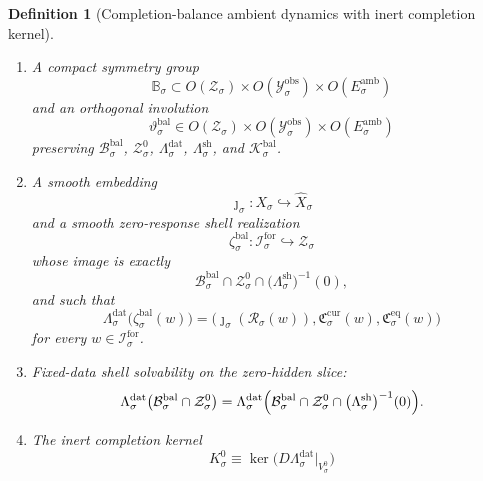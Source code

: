 \documentclass[11pt]{article}
\newcommand{\ForSpace}[1]{\mathcal I_{#1}^{\mathrm{for}}}
\newcommand{\Reduction}[1]{\mathcal R_{#1}}
\newcommand{\CurrentCarrier}[1]{\mathfrak C_{#1}^{\mathrm{cur}}}
\newcommand{\EqCarrier}[1]{\mathfrak C_{#1}^{\mathrm{eq}}}
\newcommand{\VisibleAffine}[1]{\widehat X_{#1}}
\newcommand{\DataSpace}[1]{\mathcal Y_{#1}^{\mathrm{obs}}}
\newcommand{\AmbientTarget}[1]{E_{#1}^{\mathrm{amb}}}
\newcommand{\BalSpace}[1]{\mathcal Z_{#1}}
\newcommand{\BalBody}[1]{\mathcal B_{#1}^{\mathrm{bal}}}
\newcommand{\BalData}[1]{\Lambda_{#1}^{\mathrm{dat}}}
\newcommand{\BalShell}[1]{\Lambda_{#1}^{\mathrm{sh}}}
\newcommand{\ZeroHiddenSlice}[1]{\mathcal Z_{#1}^{0}}
\newcommand{\ZeroHiddenVec}[1]{V_{#1}^{0}}
\newcommand{\Kernel}[1]{K_{#1}^{0}}
\newcommand{\BalOp}[1]{\mathcal K_{#1}^{\mathrm{bal}}}
\newcommand{\BalSym}[1]{\mathbb B_{#1}}
\newcommand{\BalTime}[1]{\vartheta_{#1}^{\mathrm{bal}}}
\newcommand{\BalEmbed}[1]{\zeta_{#1}^{\mathrm{bal}}}
\newcommand{\GapSpace}[1]{H_{#1}}
\newcommand{\GapBody}[1]{D_{#1}}
\newtheorem{definition}{Definition}
\begin{document}
\begin{definition}[Completion-balance ambient dynamics with inert completion kernel]
\begin{enumerate}
    \[
    \GapBody{\sigma}
    \equiv
    \left\{
    \eta\in\GapSpace{\sigma}:
    z+\eta\in\BalBody{\sigma}
    \text{ for some }z\in \BalBody{\sigma}\cap\ZeroHiddenSlice{\sigma}
    \right\}
    \]
    is compact and convex, satisfies
    \[
    0\in\operatorname{int}\GapBody{\sigma},
    \]
    and the ambient admissible body splits exactly as
    \begin{equation}
    \BalBody{\sigma}
    =
    \left\{
    z+\eta:
    z\in\BalBody{\sigma}\cap\ZeroHiddenSlice{\sigma},
    \quad
    \eta\in\GapBody{\sigma}
    \right\}.
    \label{eq:bodysplitting}
    \end{equation}
    \item A compact symmetry group
    \[
    \BalSym{\sigma}\subset
    O(\BalSpace{\sigma})\times
    O(\DataSpace{\sigma})\times
    O(\AmbientTarget{\sigma})
    \]
    and an orthogonal involution
    \[
    \BalTime{\sigma}\in
    O(\BalSpace{\sigma})\times
    O(\DataSpace{\sigma})\times
    O(\AmbientTarget{\sigma})
    \]
    preserving \(\BalBody{\sigma}\), \(\ZeroHiddenSlice{\sigma}\), \(\BalData{\sigma}\), \(\BalShell{\sigma}\), and \(\BalOp{\sigma}\).
    \item A smooth embedding
    \[
    \jmath_{\sigma}:X_{\sigma}\hookrightarrow\VisibleAffine{\sigma}
    \]
    and a smooth zero-response shell realization
    \[
    \BalEmbed{\sigma}:\ForSpace{\sigma}\hookrightarrow\BalSpace{\sigma}
    \]
    whose image is exactly
    \[
    \BalBody{\sigma}\cap
    \ZeroHiddenSlice{\sigma}\cap
    \bigl(\BalShell{\sigma}\bigr)^{-1}(0),
    \]
    and such that
    \begin{equation}
    \BalData{\sigma}\bigl(\BalEmbed{\sigma}(w)\bigr)
    =
    \bigl(
    \jmath_{\sigma}(\Reduction{\sigma}(w)),
    \CurrentCarrier{\sigma}(w),
    \EqCarrier{\sigma}(w)
    \bigr)
    \label{eq:ambientcompat}
    \end{equation}
    for every \(w\in\ForSpace{\sigma}\).
    \item Fixed-data shell solvability on the zero-hidden slice:
    \begin{equation}
    \BalData{\sigma}\bigl(
    \BalBody{\sigma}\cap\ZeroHiddenSlice{\sigma}
    \bigr)
    =
    \BalData{\sigma}\Bigl(
    \BalBody{\sigma}\cap
    \ZeroHiddenSlice{\sigma}\cap
    \bigl(\BalShell{\sigma}\bigr)^{-1}(0)
    \Bigr).
    \label{eq:ambientsolvability}
    \end{equation}
    \item The inert completion kernel
    \[
    \Kernel{\sigma}
    \equiv
    \ker\bigl(D\BalData{\sigma}\big|_{\ZeroHiddenVec{\sigma}}\bigr)
\]
\end{enumerate}
\end{definition}
\end{document}

